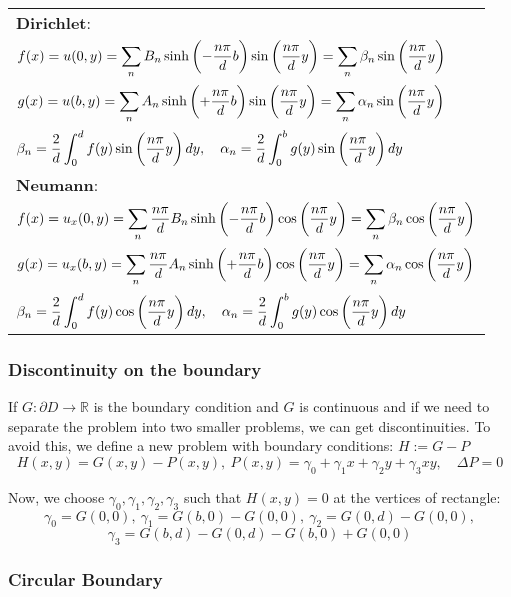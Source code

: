 \documentclass{article}
\begin{document}
\begin{twocolumn}
\begin{tabular}{C{.95\columnwidth}}
	\textbf{Dirichlet}:\\
	$\displaystyle f(x) = u(0,y) = \sum_n B_n \sinh\left(-\frac{n\pi}{d} b\right) \sin\left(\frac{n\pi}{d} y\right) = \sum_n \beta_n \sin\left(\frac{n\pi}{d} y\right)$ \\
	$\displaystyle g(x) = u(b,y) = \sum_n A_n \sinh\left(+\frac{n\pi}{d} b\right) \sin\left(\frac{n\pi}{d} y\right) = \sum_n \alpha_n \sin\left(\frac{n\pi}{d} y\right)$ \\
	$\displaystyle \beta_n = \frac{2}{d} \int_{0}^{d} f(y) \sin\left(\frac{n\pi}{d} y\right) dy, \quad \alpha_n = \frac{2}{d} \int_0^b g(y) \sin\left(\frac{n\pi}{d} y\right)dy$ \\ \midrule
	\textbf{Neumann}: \\
	$\displaystyle f(x) = u_x(0,y) = \sum_n \frac{n\pi}{d} B_n \sinh\left(-\frac{n\pi}{d} b\right) \cos\left(\frac{n\pi}{d} y\right) = \sum_n \beta_n \cos\left(\frac{n\pi}{d} y\right)$ \\
	$\displaystyle g(x) = u_x(b,y) = \sum_n \frac{n\pi}{d} A_n \sinh\left(+\frac{n\pi}{d} b\right) \cos\left(\frac{n\pi}{d} y\right) = \sum_n \alpha_n \cos\left(\frac{n\pi}{d} y\right)$ \\
	$\displaystyle \beta_n = \frac{2}{d} \int_{0}^{d} f(y) \cos\left(\frac{n\pi}{d} y\right) dy, \quad \alpha_n = \frac{2}{d} \int_0^b g(y) \cos\left(\frac{n\pi}{d} y\right)dy$ \\ 
	
\end{tabular}

\subsubsection{Discontinuity on the boundary}

If $G:\partial D \rightarrow \mathbb{R}$ is the boundary condition and $G$ is continuous and if we need to separate the problem into two smaller problems, we can get discontinuities. To avoid this, we define a new problem with boundary conditions: $H := G - P$
$$H(x,y) = G(x,y) - P(x,y), \ P(x,y) = \gamma_0 + \gamma_1 x + \gamma_2 y + \gamma_3 xy, \quad \Delta P = 0$$

Now, we choose $\gamma_0, \gamma_1, \gamma_2, \gamma_3$ such that $H(x,y) = 0$ at the vertices of rectangle:
$$\gamma_0 = G(0,0), \ \gamma_1 = G(b,0) - G(0,0), \ \gamma_2 = G(0,d) - G(0,0), $$
$$ \gamma_3 = G(b,d) - G(0,d) - G(b,0) + G(0,0)$$

\subsubsection{Circular Boundary}


\end{twocolumn}
\end{document}
